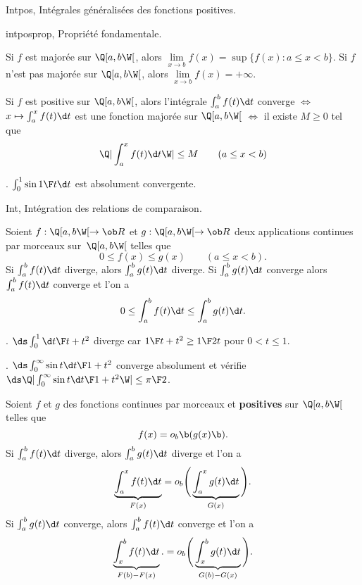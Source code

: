 \Section Intpos, Intégrales généralisées des fonctions positives. 

\Subsection intposprop, Propriété fondamentale. 


\Propriete [$a\in\ob R$, $b>a$ un élément de $\ol{\ob R}$, {$f:\Q[a,b\W[\to\ob R$} 
une fonction croissante]
Si $f$ est majorée sur $\Q[a,b\W[$, alors $\lim\limits_{x\to b}f(x)=\sup\{f(x):a\le x<b\}$. \medskip\noindent
Si $f$ n'est pas majorée sur $\Q[a,b\W[$, alors $\lim\limits_{x\to b}f(x)=+\infty$. 



\Propriete [$a\in\ob R$, $b>a$ dans $\ol{\ob R}$, {$f:\Q]a,b\W]\to\ob R$} continue par morceaux] 
Si $f$ est positive sur $\Q[a,b\W[$, alors l'intégrale $\int_a^bf(t)\d t$ converge $\Longleftrightarrow$ $x\mapsto\int_a^xf(t)\d t$ est une fonction majorée sur $\Q[a,b\W[$ $\Longleftrightarrow$ il existe $M\ge0$ tel que 
$$
\Q|\int_a^xf(t)\d t\W|\le M\qquad(a\le x<b)
$$ 


\Exemple. $\int_0^1\sin{1\F t}\d t$ est absolument convergente. 
\medskip

\Subsection Int, Intégration des relations de comparaison. 

\Propriete [$a\in\ob R$, $b>a$ un élément de $\ol R$] 
Soient $f:\Q[a,b\W[\to\ob R$ et $g:\Q[a,b\W[\to\ob R$ deux applications continues par morceaux sur~$\Q[a,b\W[$ telles que 
$$
0\le f(x)\le g(x)\qquad (a\le x<b). 
$$
Si $\int_a^bf(t)\d t$ diverge, alors $\int_a^bg(t)\d t$ diverge. \medskip\noindent
Si $\int_a^bg(t)\d t$ converge alors $\int_a^bf(t)\d t$ converge et l'on a 
$$
0\le \int_a^bf(t)\d t\le \int_a^bg(t)\d t. 
$$ 

\Exemple. $\ds\int_0^1{\d t\F t+t^2}$ diverge car ${1\F t+t^2}\ge{1\F 2t}$ pour $0<t\le 1$. 

\Exemple. $\ds\int_0^\infty{\sin t\d t\F1+t^2}$ converge absolument et vérifie 
$\ds\Q|\int_0^\infty{\sin t\d t\F1+t^2}\W|\le {\pi\F2}$. 
\medskip

\Theoreme [$a\in\ob R$ et $b>a$ élément de $\ol R$]
Soient $f$ et $g$ des fonctions continues par morceaux et {\bf positives} sur $\Q[a,b\W[$ telles que 
$$
f(x)=o_b\b(g(x)\b).
$$ 
Si $\int_a^b f(t)\d t$ diverge, alors $\int_a^bg(t)\d t$ diverge et l'on a 
$$
\underbrace{\int_a^x f(t)\d t}_{F(x)}=o_b\Bigg(\underbrace{\int_a^xg(t)\d t}_{G(x)}\Bigg). 
$$
Si $\int_a^b g(t)\d t$ converge, alors $\int_a^bf(t)\d t$ converge et l'on a 
$$
\underbrace{\int_x^b f(t)\d t}_{F(b)-F(x)}.=o_b\Bigg(\underbrace{\int_x^bg(t)\d t}_{G(b)-G(x)}\Bigg). 
$$

